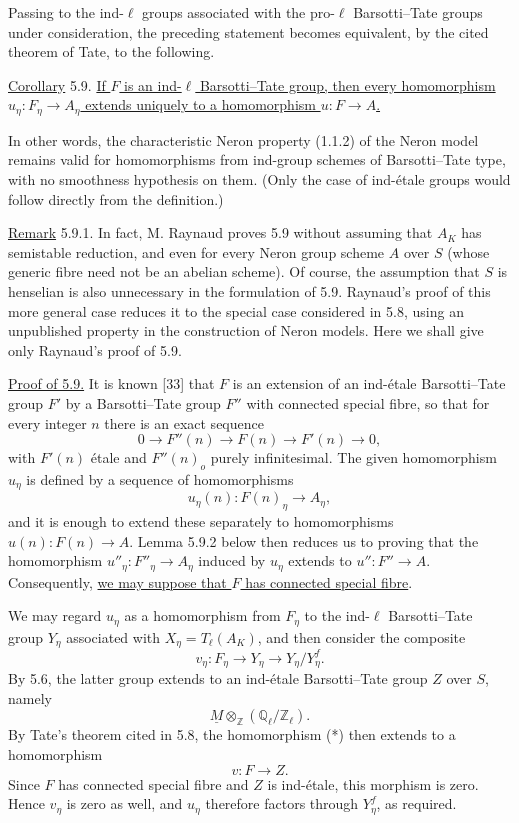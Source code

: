 Passing to the ind-$\ell$ groups associated with the pro-$\ell$
Barsotti--Tate groups under consideration, the preceding statement
becomes equivalent, by the cited theorem of Tate, to the following.

\medskip
\noindent
\underline{Corollary} 5.9. \underline{If $F$ is an ind-$\ell$
Barsotti--Tate group, then every homomorphism
$u_\eta:F_\eta\longrightarrow A_\eta$ extends uniquely to a
homomorphism $u:F\longrightarrow A$.}

In other words, the characteristic Neron property (1.1.2) of the
Neron model remains valid for homomorphisms from ind-group schemes of
Barsotti--Tate type, with no smoothness hypothesis on them. (Only the
case of ind-\'{e}tale groups would follow directly from the
definition.)

\medskip
\noindent
\underline{Remark} 5.9.1. In fact, M. Raynaud proves 5.9 without
assuming that $A_K$ has semistable reduction, and even for every Neron
group scheme $A$ over $S$ (whose generic fibre need not be an abelian
scheme). Of course, the assumption that $S$ is henselian is also
unnecessary in the formulation of 5.9. Raynaud's proof of this more
general case reduces it to the special case considered in 5.8, using
an unpublished property in the construction of Neron models. Here we
shall give only Raynaud's proof of 5.9.

\medskip
\noindent
\underline{Proof of 5.9.} It is known [33] that $F$ is an extension
of an ind-\'{e}tale Barsotti--Tate group $F'$ by a Barsotti--Tate group
$F''$ with connected special fibre, so that for every integer $n$
there is an exact sequence
\[
 0\longrightarrow F''(n)\longrightarrow F(n)
 \longrightarrow F'(n)\longrightarrow0,
\]
with $F'(n)$ \'{e}tale and $F''(n)_o$ purely infinitesimal.
The given homomorphism $u_\eta$ is defined by a sequence of
homomorphisms
\[
 u_\eta(n):F(n)_\eta\longrightarrow A_\eta,
\]
and it is enough to extend these separately to homomorphisms
$u(n):F(n)\longrightarrow A$. Lemma 5.9.2 below then reduces us to
proving that the homomorphism
$u''_\eta:F''_\eta\longrightarrow A_\eta$ induced by $u_\eta$
extends to $u'':F''\longrightarrow A$. Consequently, \underline{we
may suppose that $F$ has connected special fibre}.

We may regard $u_\eta$ as a homomorphism from $F_\eta$ to the
ind-$\ell$ Barsotti--Tate group $Y_\eta$ associated with
$X_\eta=T_\ell(A_K)$, and then consider the composite
\begin{equation}\tag{*}
 v_\eta:F_\eta\longrightarrow Y_\eta
 \longrightarrow Y_\eta/Y_\eta^f.
\end{equation}
By 5.6, the latter group extends to an ind-\'{e}tale
Barsotti--Tate group $Z$ over $S$, namely
\[
 \underline M\otimes_{\mathbb Z}(\mathbb Q_\ell/\mathbb Z_\ell).
\]
By Tate's theorem cited in 5.8, the homomorphism (*) then extends to a
homomorphism
\[
 v:F\longrightarrow Z.
\]
Since $F$ has connected special fibre and $Z$ is ind-\'{e}tale, this
morphism is zero. Hence $v_\eta$ is zero as well, and $u_\eta$
therefore factors through $Y_\eta^f$, as required.

